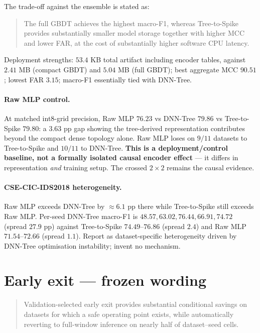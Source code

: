The trade-off against the ensemble is stated as:
\begin{quote}
The full GBDT achieves the highest macro-F1, whereas Tree-to-Spike provides
substantially smaller model storage together with higher MCC and lower FAR, at the
cost of substantially higher software CPU latency.
\end{quote}

\noindent Deployment strengths: $53.4$ KB total artifact including encoder tables,
against $2.41$ MB (compact GBDT) and $5.04$ MB (full GBDT); best aggregate MCC
$90.51$; lowest FAR $3.15$; macro-F1 essentially tied with DNN-Tree.

\paragraph{Raw MLP control.} At matched int8-grid precision, Raw MLP $76.23$ vs
DNN-Tree $79.86$ vs Tree-to-Spike $79.80$: a $3.63$ pp gap showing the tree-derived
representation contributes beyond the compact dense topology alone. Raw MLP loses on
$9/11$ datasets to Tree-to-Spike and $10/11$ to DNN-Tree. \textbf{This is a
deployment/control baseline, not a formally isolated causal encoder effect} --- it
differs in representation \emph{and} training setup. The crossed $2\times2$ remains
the causal evidence.

\paragraph{CSE-CIC-IDS2018 heterogeneity.} Raw MLP exceeds DNN-Tree by $\approx6.1$ pp
there while Tree-to-Spike still exceeds Raw MLP. Per-seed DNN-Tree macro-F1 is
$48.57, 63.02, 76.44, 66.91, 74.72$ (spread $27.9$ pp) against Tree-to-Spike
$74.49$--$76.86$ (spread $2.4$) and Raw MLP $71.54$--$72.66$ (spread $1.1$). Report as
dataset-specific heterogeneity driven by DNN-Tree optimisation instability; invent no
mechanism.

\section*{Early exit --- frozen wording}

\begin{quote}
Validation-selected early exit provides substantial conditional savings on datasets
for which a safe operating point exists, while automatically reverting to full-window
inference on nearly half of dataset--seed cells.
\end{quote}

